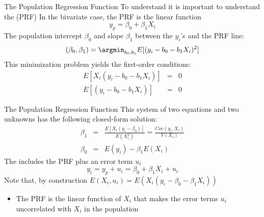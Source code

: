\begin{frame}{The Population Regression Function}
To understand  it is important to understand the  (PRF)
\vfill
In the bivariate case, the PRF is the linear function
\begin{equation}
y_p=\beta_0 + \beta_1 X_i
\label{eq9}
\end{equation}
\vfill
The population intercept $\beta_0$ and slope $\beta_1$  between the $y_i$'s and the PRF line:
\begin{equation}
(\beta_0, \beta_1)=\displaystyle\argmin_{b_0, b_1} E[(y_i-b_0-b_1X_i)^2]
\label{eq10}
\end{equation}
\vfill
This minimization problem yields the first-order conditions:
\begin{eqnarray}
E[X_i(y_i-b_0-b_1X_i)] &=& 0 \\
E[(y_i-b_0-b_1X_i)] &=& 0
\nonumber
\label{eq11}
\end{eqnarray}

\end{frame}


\begin{frame}{The Population Regression Function}
This system of two equations and two unknowns has the following closed-form solution:
\begin{eqnarray}
\beta_1&=&\frac{E[X_i(y_i-\beta_0)]}{E(X_i^2)}=\frac{Cov(y_i, X_i)}{V(X_i)}\\
\beta_0&=&E(y_i)-\beta_1 E(X_i)
\nonumber
\label{eq12}
\end{eqnarray}
\vfill
\pause
The  includes the PRF plus an error term $u_i$
\begin{equation}
y_i=y_p+ u_i=\beta_0 + \beta_1 X_i + u_i
\label{eq12}
\end{equation}
\vfill
Note that, by construction $E(X_i, u_i)=E(X_i(y_i-\beta_0 - \beta_1 X_i))$
\begin{itemize}
\item The PRF is the linear function of $X_i$ that makes the error terms $u_i$ uncorrelated with $X_i$ in the population
\end{itemize}
\end{frame}

